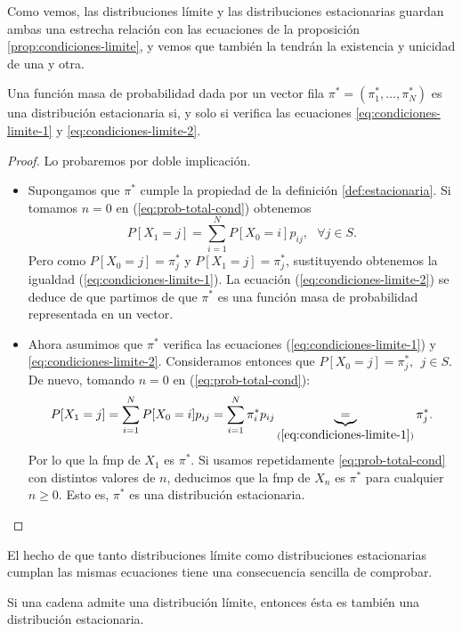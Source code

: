 Como vemos, las distribuciones límite y las distribuciones estacionarias guardan ambas una estrecha relación con las ecuaciones de la proposición \ref{prop:condiciones-limite}, y vemos que también la tendrán la existencia y unicidad de una y otra.

\begin{proposicion}
    Una función masa de probabilidad dada por un vector fila $\pi^* =(\pi_1^*,\dots,\pi_N^*)$ es una distribución estacionaria si, y solo si verifica las ecuaciones \eqref{eq:condiciones-limite-1} y \eqref{eq:condiciones-limite-2}.
\end{proposicion}
\begin{proof}
    Lo probaremos por doble implicación.
    \begin{itemize}
        \item[\fcolorbox{black}{white}{$\Rightarrow$}] Supongamos que $\pi^*$ cumple la propiedad de la definición \ref{def:estacionaria}. Si tomamos $n=0$ en (\ref{eq:prob-total-cond}) obtenemos
        $$
        P[X_{1}=j]=\sum_{i=1}^N P[X_0=i] p_{ij}, \ \ \ \forall j\in S.
        $$ 
        Pero como $P[X_0=j]=\pi_j^*$ y $P[X_{1}=j]=\pi_j^*$, sustituyendo obtenemos la igualdad (\ref{eq:condiciones-limite-1}). La ecuación (\ref{eq:condiciones-limite-2}) se deduce de que partimos de que $\pi^*$ es una función masa de probabilidad representada en un vector.
        \item[\fcolorbox{black}{white}{$\Leftarrow$}] Ahora asumimos que $\pi^*$ verifica las ecuaciones (\ref{eq:condiciones-limite-1}) y \eqref{eq:condiciones-limite-2}. Consideramos entonces que $P[X_0=j]=\pi_j^*, \ \ j\in S$. De nuevo, tomando $n=0$ en (\ref{eq:prob-total-cond}):
        $$
        P[X_{1}=j]=\sum_{i=1}^N P[X_0=i] p_{ij} = \sum_{i=1}^N \pi_i^* p_{ij} \underbrace{=}_{(\ref{eq:condiciones-limite-1})}\pi_j^*.
        $$
        Por lo que la fmp de $X_1$ es $\pi^*$. Si usamos repetidamente \eqref{eq:prob-total-cond} con distintos valores de $n$, deducimos que la fmp de $X_n$ es $\pi^*$ para cualquier $n\geq 0$. Esto es, $\pi^*$ es una distribución estacionaria.
    \end{itemize}
\end{proof}

El hecho de que tanto distribuciones límite como distribuciones estacionarias cumplan las mismas ecuaciones tiene una consecuencia sencilla de comprobar.

\begin{corolario}
    Si una cadena admite una distribución límite, entonces ésta es también una distribución estacionaria.
\end{corolario}

